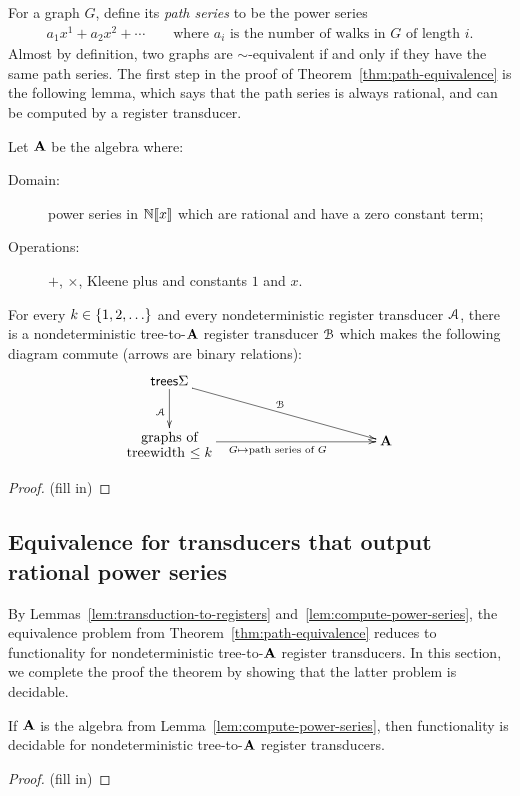 For a graph $G$, define its \emph{path series} to be the power series 
\begin{align*}
  a_1 x^1 + a_2x^2 + \cdots \qquad \text{where $a_i$ is the number of walks in $G$ of length $i$.}
\end{align*}
Almost by definition, two graphs are $\sim$-equivalent if and only if they have the same path series. 
The first step in the proof of Theorem~\ref{thm:path-equivalence} is the following lemma, which says  that the path series is always  rational, and can be computed by a register transducer.
\begin{lemma}\label{lem:compute-power-series}    
    Let $\mathbf{A}$ be the algebra where:
    \begin{description}
        \item[Domain:]power series in $\mathbb N [\![x]\!]$ which are rational and have a  zero constant term;
        \item[Operations:] $+$, $\times$, Kleene plus and constants $1$ and $x$.
    \end{description}
    For every $k \in \{1,2,\ldots\}$ and every nondeterministic   register transducer ${\mathcal A}$, there is a nondeterministic tree-to-$\mathbf{A}$ register transducer ${\mathcal B}$ which makes the following diagram commute (arrows are binary relations):
    \begin{align*}
    \xymatrix@C=4cm{
        \trees \Sigma   
        \ar[dr]^{\Bb}
        \ar[d]_{\Aa} \\
        \txt{graphs of\\
        treewidth $\le k$} \ar[r]_{G \mapsto \text{path series of $G$}}& \aalg
    }
    \end{align*}
\end{lemma}
\begin{proof}
    (fill in)
\end{proof}

\subsection{Equivalence for transducers that output rational power series}
\label{sec:decide-power-series}
By Lemmas~\ref{lem:transduction-to-registers} and~\ref{lem:compute-power-series}, the  equivalence problem from Theorem~\ref{thm:path-equivalence} reduces to functionality for nondeterministic tree-to-$\mathbf{A}$ register transducers. In this section, we complete the proof the theorem by showing that the latter problem is decidable.
\begin{lemma}\label{lem:functionality-decidable-power-series} If $\mathbf{A}$ is the algebra from Lemma~\ref{lem:compute-power-series}, then functionality is decidable for nondeterministic tree-to-$\mathbf{A}$ register transducers. 
\end{lemma}
\begin{proof}
    (fill in)
\end{proof}

